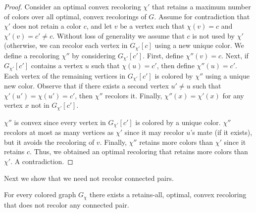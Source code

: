 \begin{proof}
Consider an optimal convex recoloring $\chi'$ that retains a maximum
number of colors over all optimal, 
convex recolorings of $G$.
%
Assume for contradiction that $\chi'$ does not retain a color $c$, 
and let $v$ be a vertex such that $\chi(v) = c$ and $\chi'(v) = c' \neq c$.
%
Without loss of generality we assume that $c$ is not used by $\chi'$ 
(otherwise, we can recolor each vertex in $G_{\chi'}[c]$ using a new unique color.
%
We define a recoloring $\chi''$ by considering $G_{\chi'}[c']$.
%
First, 
define $\chi''(v) = c$.
Next, 
if $G_{\chi'}[c']$ contains a vertex $u$ such that $\chi(u) = c'$, 
then define $\chi''(u) = c'$.
%
Each vertex of the remaining vertices in $G_{\chi'}[c']$ is colored by $\chi''$ 
using a unique new color.
%
Observe that if there exists a second vertex 
$u' \neq u$ such that $\chi'(u') = \chi(u') = c'$, 
then $\chi''$ recolors it.
%
Finally, 
$\chi''(x) = \chi'(x)$ for any vertex $x$ not in $G_{\chi'}[c']$.

$\chi''$ is convex since every vertex in
$G_{\chi'}[c']$ is colored by a unique color. 
%
$\chi''$ recolors at most as many vertices as $\chi'$ 
since it may recolor $u$'s mate (if it exists), 
but it avoids the recoloring of $v$. 
%
Finally, 
$\chi''$ retains more colors than $\chi'$ 
since it retains $c$.
%
Thus, 
we obtained an optimal recoloring that retains more colors than $\chi'$.  
%
A contradiction.
{}\end{proof}

Next we show that we need not recolor connected pairs.

\begin{lemma}
\label{lm:does_not_recolor_connected_pair}
For every colored graph $G_\chi$ there exists a retains-all,
optimal,
convex recoloring that does not recolor any connected pair.
\end{lemma}

